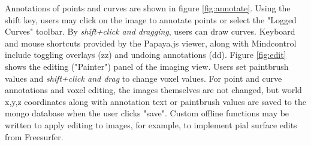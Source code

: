 Annotations of points and curves are shown in figure \ref{fig:annotate}. Using the shift key, users may click on the image to annotate points or select the "Logged Curves" toolbar. By \textit{shift+click and dragging}, users can draw curves. Keyboard and mouse shortcuts provided by the Papaya.js viewer, along with Mindcontrol include toggling overlays (zz) and undoing annotations (dd). Figure \ref{fig:edit} shows the editing ("Painter") panel of the imaging view. Users set paintbrush values and \textit{shift+click and drag} to change voxel values. For point and curve annotations and voxel editing, the images themselves are not changed, but world x,y,z coordinates along with annotation text or paintbrush values are saved to the mongo database when the user clicks "save". Custom offline functions may be written to apply editing to images, for example, to implement pial surface edits from Freesurfer. 